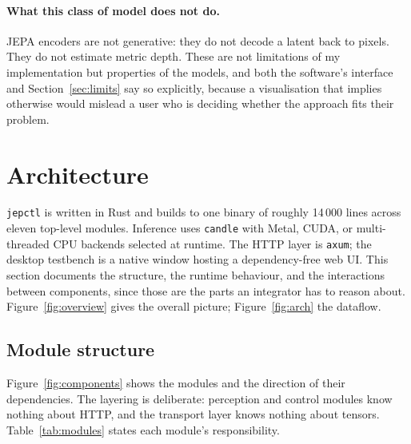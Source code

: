 \documentclass[11pt,onecolumn]{article}
\newcommand{\jepctl}{\texttt{jepctl}}
\newcommand{\code}[1]{\texttt{#1}}
\begin{document}
\paragraph{What this class of model does not do.}
JEPA encoders are not generative: they do not decode a latent back to pixels. They do not
estimate metric depth. These are not limitations of my implementation but properties of
the models, and both the software's interface and Section~\ref{sec:limits} say so
explicitly, because a visualisation that implies otherwise would mislead a user who is
deciding whether the approach fits their problem.

\section{Architecture}

\jepctl{} is written in Rust and builds to one binary of roughly 14\,000 lines across
eleven top-level modules. Inference uses \code{candle} \cite{candle} with Metal, CUDA, or
multi-threaded CPU backends selected at runtime. The HTTP layer is \code{axum}; the
desktop testbench is a native window hosting a dependency-free web UI. This section
documents the structure, the runtime behaviour, and the interactions between components,
since those are the parts an integrator has to reason about. Figure~\ref{fig:overview}
gives the overall picture; Figure~\ref{fig:arch} the dataflow.

\subsection{Module structure}
\label{sec:modules}

Figure~\ref{fig:components} shows the modules and the direction of their dependencies.
The layering is deliberate: perception and control modules know nothing about HTTP, and
the transport layer knows nothing about tensors. Table~\ref{tab:modules} states each
module's responsibility.
\end{document}
